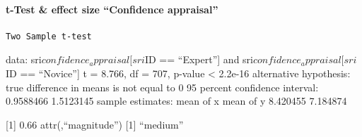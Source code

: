 \documentclass[
]{article}
\begin{document}
\paragraph{t-Test \& effect size ``Confidence
appraisal''}\label{t-test-effect-size-confidence-appraisal}

\begin{verbatim}
Two Sample t-test
\end{verbatim}

data: sri\(confidence_appraisal[sri\)ID == ``Expert''{]} and
sri\(confidence_appraisal[sri\)ID == ``Novice''{]} t = 8.766, df = 707,
p-value \textless{} 2.2e-16 alternative hypothesis: true difference in
means is not equal to 0 95 percent confidence interval: 0.9588466
1.5123145 sample estimates: mean of x mean of y 8.420455 7.184874

{[}1{]} 0.66 attr(,``magnitude'') {[}1{]} ``medium''
\end{document}
